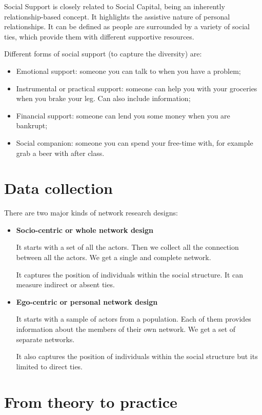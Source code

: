 \documentclass[
  notitlepage,
  onecolumn,
  openany]{book}
\providecommand{\tightlist}{%
  \setlength{\itemsep}{0pt}\setlength{\parskip}{0pt}}
\begin{document}
Social Support is closely related to Social Capital, being an inherently relationship-based concept. It highlights the assistive nature of personal relationships. It can be defined as people are surrounded by a variety of social ties, which provide them with different supportive resources.

Different forms of social support (to capture the diversity) are:

\begin{itemize}
\tightlist
\item
  Emotional support: someone you can talk to when you have a problem;
\item
  Instrumental or practical support: someone can help you with your groceries when you brake your leg. Can also include information;
\item
  Financial support: someone can lend you some money when you are bankrupt;
\item
  Social companion: someone you can spend your free-time with, for example grab a beer with after class.
\end{itemize}

\hypertarget{data-collection}{%
\section{Data collection}\label{data-collection}}

There are two major kinds of network research designs:

\begin{itemize}
\item
  \textbf{Socio-centric or whole network design}

  It starts with a set of all the actors. Then we collect all the connection between all the actors. We get a single and complete network.

  It captures the position of individuals within the social structure. It can measure indirect or absent ties.
\item
  \textbf{Ego-centric or personal network design}

  It starts with a sample of actors from a population. Each of them provides information about the members of their own network. We get a set of separate networks.

  It also captures the position of individuals within the social structure but its limited to direct ties.
\end{itemize}

\hypertarget{from-theory-to-practice}{%
\section{From theory to practice}\label{from-theory-to-practice}}
\end{document}
